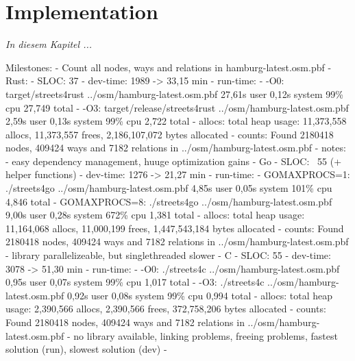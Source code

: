 \chapter{Implementation}
\label{chap:Implementation}

\textit{%
In diesem Kapitel ...
}
\bigskip


Milestones:
    - Count all nodes, ways and relations in hamburg-latest.osm.pbf
        - Rust:
            - SLOC: 37
            - dev-time: 1989 -> 33,15 min
            - run-time:
                - -O0: target/streets4rust ../osm/hamburg-latest.osm.pbf  27,61s user 0,12s system 99\% cpu 27,749 total
                - -O3: target/release/streets4rust ../osm/hamburg-latest.osm.pbf  2,59s user 0,13s system 99\% cpu 2,722 total
            - allocs: total heap usage: 11,373,558 allocs, 11,373,557 frees, 2,186,107,072 bytes allocated
            - counts: Found 2180418 nodes, 409424 ways and 7182 relations in ../osm/hamburg-latest.osm.pbf
            - notes:
                - easy dependency management, huuge optimization gains
        - Go
            - SLOC: ~55 (+ helper functions)
            - dev-time: 1276 -> 21,27 min
            - run-time:
                - GOMAXPROCS=1: ./streets4go ../osm/hamburg-latest.osm.pbf  4,85s user 0,05s system 101\% cpu 4,846 total
                - GOMAXPROCS=8: ./streets4go ../osm/hamburg-latest.osm.pbf  9,00s user 0,28s system 672\% cpu 1,381 total
            - allocs: total heap usage: 11,164,068 allocs, 11,000,199 frees, 1,447,543,184 bytes allocated
            - counts: Found 2180418 nodes, 409424 ways and 7182 relations in ../osm/hamburg-latest.osm.pbf
                - library parallelizeable, but singlethreaded slower
        - C
            - SLOC: 55
            - dev-time: 3078 -> 51,30 min
            - run-time:
                - -O0: ./streets4c ../osm/hamburg-latest.osm.pbf  0,95s user 0,07s system 99\% cpu 1,017 total
                - -O3: ./streets4c ../osm/hamburg-latest.osm.pbf  0,92s user 0,08s system 99\% cpu 0,994 total
            - allocs: total heap usage: 2,390,566 allocs, 2,390,566 frees, 372,758,206 bytes allocated
            - counts: Found 2180418 nodes, 409424 ways and 7182 relations in ../osm/hamburg-latest.osm.pbf
                - no library available, linking problems, freeing problems, fastest solution (run), slowest solution (dev)
    - 
